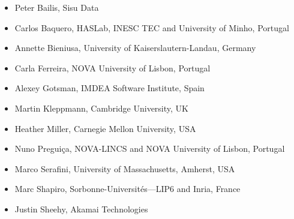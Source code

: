 \documentclass[acmlarge,nonacm]{acmart}
\begin{document}
\begin{itemize}
\item Peter Bailis, Sisu Data
\item Carlos Baquero, HASLab, INESC TEC and University of Minho, Portugal
\item Annette Bieniusa, University of Kaiserslautern-Landau, Germany
\item Carla Ferreira, NOVA University of Lisbon, Portugal
\item Alexey Gotsman, IMDEA Software Institute, Spain
\item Martin Kleppmann, Cambridge University, UK
\item Heather Miller, Carnegie Mellon University, USA
\item Nuno Preguiça, NOVA-LINCS and NOVA University of Lisbon, Portugal
\item Marco Serafini, University of Massachusetts, Amherst, USA
\item Marc Shapiro, Sorbonne-Universités—LIP6 and Inria, France
\item Justin Sheehy, Akamai Technologies
\end{itemize}
\end{document}
